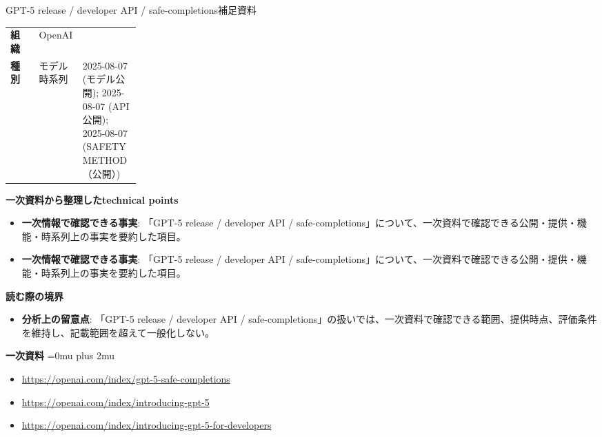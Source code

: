 \begin{technicalnote}{GPT-5 release / developer API / safe-completions}{補足資料}
\begingroup
\begin{tabularx}{\linewidth}{@{}>{\bfseries}p{0.22\linewidth}X@{}}
組織 & OpenAI \\
種別 & モデル
時系列 & 2025-08-07 (モデル公開); 2025-08-07 (API公開); 2025-08-07 (SAFETY METHOD（公開）) \\
\end{tabularx}
\smallskip
{\bfseries 一次資料から整理したtechnical points}
\begin{itemize}[leftmargin=1.5em,itemsep=0.35em]
\item \textbf{一次情報で確認できる事実}: 「GPT-5 release / developer API / safe-completions」について、一次資料で確認できる公開・提供・機能・時系列上の事実を要約した項目。
\item \textbf{一次情報で確認できる事実}: 「GPT-5 release / developer API / safe-completions」について、一次資料で確認できる公開・提供・機能・時系列上の事実を要約した項目。
\end{itemize}
\begin{minipage}{\linewidth}
{\bfseries 読む際の境界}
\begin{itemize}[leftmargin=1.5em,itemsep=0.35em]
\item \textbf{分析上の留意点}: 「GPT-5 release / developer API / safe-completions」の扱いでは、一次資料で確認できる範囲、提供時点、評価条件を維持し、記載範囲を超えて一般化しない。
\end{itemize}
\begin{samepage}
{\bfseries 一次資料}
\begingroup\sloppy
\Urlmuskip=0mu plus 2mu\relax
\begin{itemize}[leftmargin=1.5em,itemsep=0.25em]
\item {\scriptsize\url{https://openai.com/index/gpt-5-safe-completions}}
\item {\scriptsize\url{https://openai.com/index/introducing-gpt-5}}
\item {\scriptsize\url{https://openai.com/index/introducing-gpt-5-for-developers}}
\end{itemize}
\endgroup
\end{samepage}
\end{minipage}
\endgroup
\end{technicalnote}
\medskip

